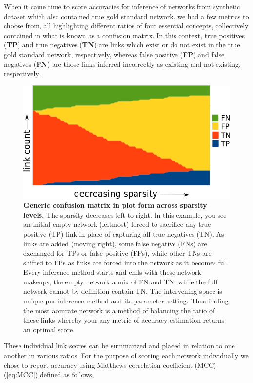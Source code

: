 When it came time to score accuracies for inference of networks from synthetic dataset which also contained true gold standard network, we had a few metrics to choose from, all highlighting different ratios of four essential concepts, collectively contained in what is known as a confusion matrix. In this context, true positives (\textbf{TP}) and true negatives (\textbf{TN}) are links which exist or do not exist in the true gold standard network, respectively, whereas false positive (\textbf{FP}) and false negatives (\textbf{FN}) are those links inferred incorrectly as existing and not existing, respectively.

\begin{figure}
\centering
\includegraphics[width=1\linewidth]{4/confusionMatrix_sparsity.png}
\caption{\textbf{Generic confusion matrix in plot form across sparsity levels.} The sparsity decreases left to right. In this example, you see an initial empty network (leftmost) forced to sacrifice any true positive (TP) link in place of capturing all true negatives (TN). As links are added (moving right), some false negative (FNs) are exchanged for TPs or false positive (FPs), while other TNs are shifted to FPs as links are forced into the network as it becomes full. Every inference method starts and ends with these network makeups, the empty network a mix of FN and TN, while the full network cannot by definition contain TN. The intervening space is unique per inference method and its parameter setting. Thus finding the most accurate network is a method of balancing the ratio of these links whereby your any metric of accuracy estimation returns an optimal score.}
\label{fig:confusion}
\end{figure}

These individual link scores can be summarized and placed in relation to one another in various ratios. For the purpose of scoring each network individually we chose to report accuracy using Matthews correlation coefficient (MCC) (\cref{eq:MCC}) defined as follows,

